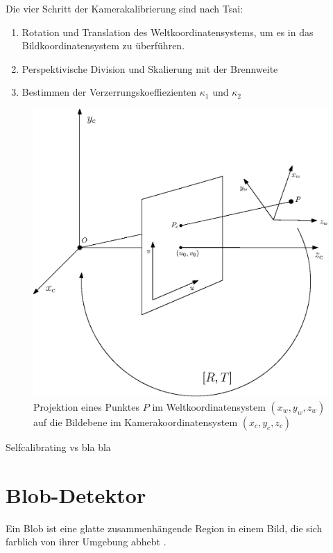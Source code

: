 Die vier Schritt der Kamerakalibrierung sind nach Tsai\cite{Tsai1987}:
\begin{enumerate}
	\item Rotation und Translation des Weltkoordinatensystems, um es in das Bildkoordinatensystem zu überführen.
	\item Perspektivische Division und Skalierung mit der Brennweite
	\item Bestimmen der Verzerrungskoeffiezienten $\kappa_1$ und $\kappa_2$
\end{enumerate}

\begin{figure}[!htb]
	\centering
	\includegraphics[scale=.8]{images/pinhole.eps}
	\caption{Projektion eines Punktes $P$ im Weltkoordinatensystem $(x_w, y_w, z_w)$ auf die Bildebene im Kamerakoordinatensystem  $(x_c, y_c, z_c)$}
	\label{fig:extrinsic}
\end{figure}



Selfcalibrating vs bla bla




\section{Blob-Detektor}
\label{s:blob}
\begin{definition}[Blob]\label{def:blob}
	Ein Blob ist eine glatte zusammenhängende Region in einem Bild, die sich farblich von ihrer Umgebung abhebt \cite{Lindeberg1993}.
\end{definition}

